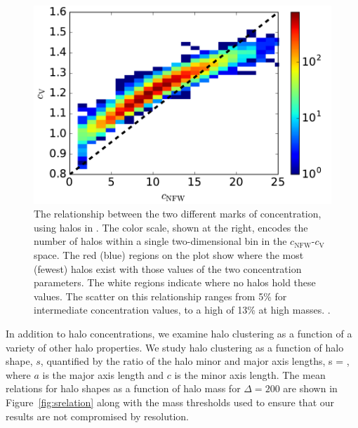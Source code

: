 \documentclass[usenatbib]{mnras}
\begin{document}
\begin{figure}
\centering
\includegraphics[width=.5\textwidth]{cvvscnfw_relation.pdf}
\caption{
The relationship between the two different marks of concentration, 
using halos in \simB. The color scale, shown at the right, encodes the number of halos 
within a single two-dimensional bin in the $c_{\mathrm{NFW}}$-$c_{\mathrm{V}}$ space. 
The red (blue) regions on the plot show where the most (fewest) halos exist with those values of the two
concentration parameters. The white regions indicate where no halos hold these values. The scatter on this relationship ranges from 5\% for intermediate concentration values, to a high of 13\% at high masses. .
}
\label{fig:concentrations}
\end{figure}



In addition to halo concentrations, we examine halo clustering as a function of a variety of other 
halo properties. We study halo clustering as a function of halo shape, $s$, 
quantified by the ratio of the halo minor and major axis lengths, 
%
\beq
s = ,
\eeq
%
where $a$ is the major axis length and $c$ is the minor axis length. 
The mean relations for halo shapes as a function of halo mass for $\Delta=200$ 
are shown in Figure~\ref{fig:srelation} along with the mass 
thresholds used to ensure that our results are not compromised by 
resolution.
\end{document}
